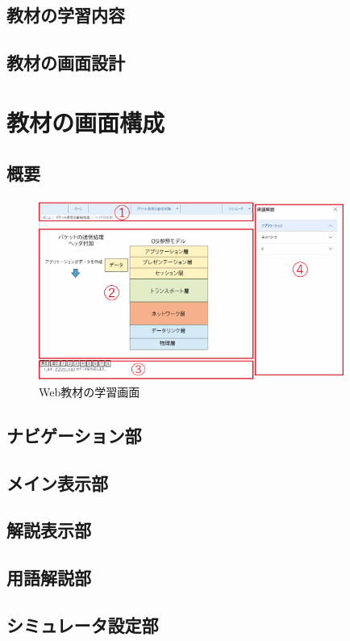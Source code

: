 \documentclass[12pt,a4j,titlepage]{ltjsarticle}
\begin{document}
\subsection{教材の学習内容}
\subsection{教材の画面設計}

\clearpage

\section{教材の画面構成}%
\subsection{概要}

\begin{figure}[h]
\begin{center}
 \includegraphics[clip,width=100mm]{figures/gamen.pdf}
\end{center}
 \caption{Web教材の学習画面}
 \label{fig:画面}
\end{figure}

\subsection{ナビゲーション部}
\subsection{メイン表示部}
\subsection{解説表示部}
\subsection{用語解説部}
\subsection{シミュレータ設定部}
\end{document}
